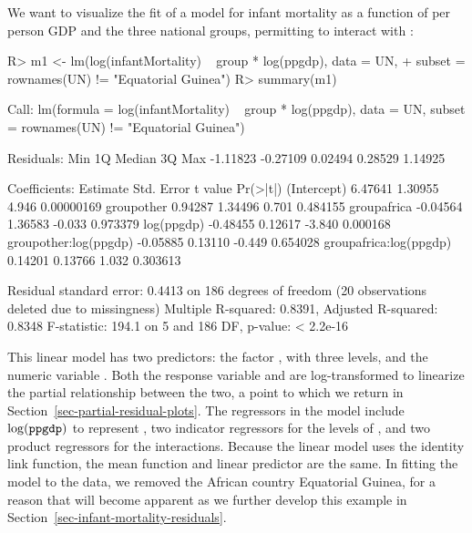 \documentclass[article]{jss}
\newcommand{\lvn}[1]{\mbox{$\log(\mbox{\texttt{#1}})$}}
\begin{document}
We want to visualize the fit of a model for infant mortality as a function of per person GDP and the three national groups, permitting  to interact with :
%
\begin{Schunk}
\begin{Sinput}
R> m1 <- lm(log(infantMortality) ~ group * log(ppgdp), data = UN,
+    subset = rownames(UN) != "Equatorial Guinea")
R> summary(m1)
\end{Sinput}
\begin{Soutput}
Call:
lm(formula = log(infantMortality) ~ group * log(ppgdp), data = UN, 
    subset = rownames(UN) != "Equatorial Guinea")

Residuals:
     Min       1Q   Median       3Q      Max 
-1.11823 -0.27109  0.02494  0.28529  1.14925 

Coefficients:
                       Estimate Std. Error t value   Pr(>|t|)
(Intercept)             6.47641    1.30955   4.946 0.00000169
groupother              0.94287    1.34496   0.701   0.484155
groupafrica            -0.04564    1.36583  -0.033   0.973379
log(ppgdp)             -0.48455    0.12617  -3.840   0.000168
groupother:log(ppgdp)  -0.05885    0.13110  -0.449   0.654028
groupafrica:log(ppgdp)  0.14201    0.13766   1.032   0.303613

Residual standard error: 0.4413 on 186 degrees of freedom
  (20 observations deleted due to missingness)
Multiple R-squared:  0.8391,	Adjusted R-squared:  0.8348 
F-statistic: 194.1 on 5 and 186 DF,  p-value: < 2.2e-16
\end{Soutput}
\end{Schunk}
%
This linear model has two predictors: the factor , with
three levels, and the numeric variable . Both the response
variable and  are log-transformed to linearize the partial
relationship between the two, a point to which we return in
Section~\ref{sec-partial-residual-plots}.  The regressors in the model
include \lvn{ppgdp} to represent , two indicator
regressors for the levels of , and two product regressors
for the interactions.  Because the linear model uses the identity link
function, the mean function and linear predictor are the same. In
fitting the model to the data, we removed the African country
Equatorial Guinea, for a reason that will become apparent as we
further develop this example in
Section~\ref{sec-infant-mortality-residuals}.
\end{document}

